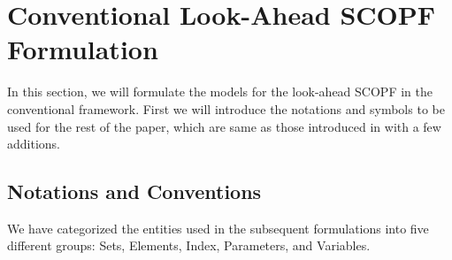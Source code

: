 \documentclass[preprint,12pt,3p]{elsarticle}
\begin{document}
	\section{Conventional Look-Ahead SCOPF Formulation}
	\label{conventional}
	In this section, we will formulate the models for the look-ahead SCOPF in the conventional framework. First we will introduce the notations and symbols to be used for the rest of the paper, which are same as those introduced in \cite{CK:14} with a few additions.
	\subsection{Notations and Conventions}
	\label{notations}
	We have categorized the entities used in the subsequent formulations into five different groups: Sets, Elements, Index, Parameters, and Variables.\\
\end{document}
